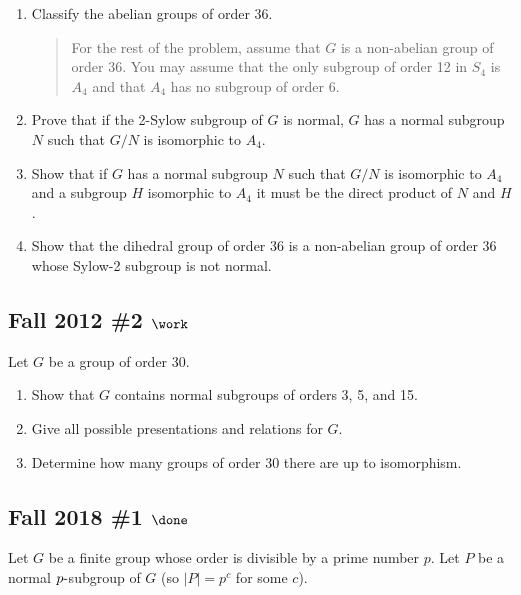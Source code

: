 \begin{enumerate}
\def\labelenumi{\alph{enumi}.}
\item
  Classify the abelian groups of order 36.

  \begin{quote}
  For the rest of the problem, assume that \(G\) is a non-abelian group
  of order 36. You may assume that the only subgroup of order 12 in
  \(S_4\) is \(A_4\) and that \(A_4\) has no subgroup of order 6.
  \end{quote}
\item
  Prove that if the 2-Sylow subgroup of \(G\) is normal, \(G\) has a
  normal subgroup \(N\) such that \(G/N\) is isomorphic to \(A_4\).
\item
  Show that if \(G\) has a normal subgroup \(N\) such that \(G/N\) is
  isomorphic to \(A_4\) and a subgroup \(H\) isomorphic to \(A_4\) it
  must be the direct product of \(N\) and \(H\).
\item
  Show that the dihedral group of order 36 is a non-abelian group of
  order 36 whose Sylow-2 subgroup is not normal.
\end{enumerate}

\hypertarget{fall-2012-2-work}{%
\subsection{\texorpdfstring{Fall 2012 \#2
\(\work\)}{Fall 2012 \#2 \textbackslash work}}\label{fall-2012-2-work}}

Let \(G\) be a group of order 30.

\begin{enumerate}
\def\labelenumi{\alph{enumi}.}
\item
  Show that \(G\) contains normal subgroups of orders 3, 5, and 15.
\item
  Give all possible presentations and relations for \(G\).
\item
  Determine how many groups of order 30 there are up to isomorphism.
\end{enumerate}

\hypertarget{fall-2018-1-done}{%
\subsection{\texorpdfstring{Fall 2018 \#1
\(\done\)}{Fall 2018 \#1 \textbackslash done}}\label{fall-2018-1-done}}

Let \(G\) be a finite group whose order is divisible by a prime number
\(p\). Let \(P\) be a normal \(p{\hbox{-}}\)subgroup of \(G\) (so
\({\left\lvert {P} \right\rvert} = p^c\) for some \(c\)).


